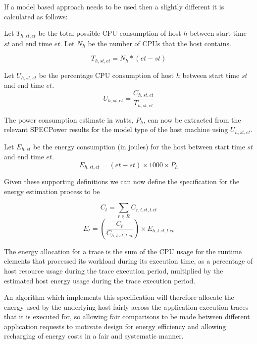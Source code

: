 If a model based approach needs to be used then a slightly different it is calculated as follows:

Let $T_{h,st,et}$ be the total possible CPU consumption of host $h$ between start time $st$ and end time $et$.  Let $N_{h}$ be the number of CPUs that the host contains.

\begin{equation}
T_{h,st,et} = N_{h} * (et - st)
\end{equation}

Let $U_{h,st,et}$ be the percentage CPU consumption of host $h$ between start time $st$ and end time $et$.
\begin{equation}
U_{h,st,et} = \frac{C_{h,st,et}}{T_{h,st,et}}
\end{equation}

The power consumption estimate in watts, $P_{h}$, can now be extracted from the relevant SPECPower results for the model type of the host machine using $U_{h,st,et}$.

Let $E_{h,st}$ be the energy consumption (in joules) for the host between start time $st$ and end time $et$.
\begin{equation}
E_{h,st,et} = (et - st) \times 1000 \times P_{h}
\end{equation}

Given these supporting definitions we can now define the specification for the energy estimation process to be

\begin{equation}
C_{t} = \sum_{r \in R} C_{r,t.st,t.et}
\end{equation}
\begin{equation}
E_{t} = \left( \frac {C_{t}} {C_{h,t.st,t.et}} \right) \times E_{h, t.st, t.et}
\end{equation}

The energy allocation for a trace is the sum of the CPU usage for the runtime elements that processed its workload during its execution time, as a percentage of host resource usage during the trace execution period, multiplied by the estimated host energy usage during the trace execution period.

An algorithm which implements this specification will therefore allocate the energy used by the underlying host fairly across the application execution traces that it is executed for, so allowing fair comparisons to be made between different application requests to motivate design for energy efficiency and allowing recharging of energy costs in a fair and systematic manner.

